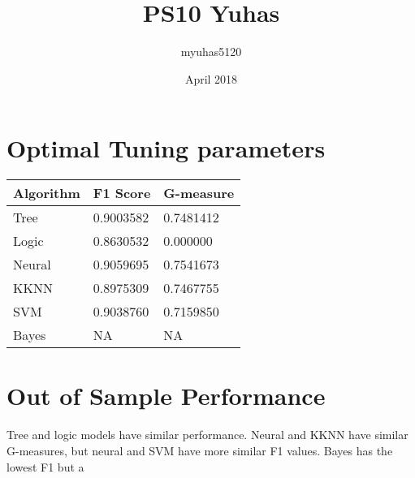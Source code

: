 \documentclass{article}
\title{PS10 Yuhas}
\author{myuhas5120 }
\date{April 2018}
\begin{document}
\maketitle

\section{Optimal Tuning parameters}
\begin{tabular}{ |p{3cm}||p{3cm}|p{3cm}| }
 \hline
 Algorithm & F1 Score & G-measure \\
 \hline
 Tree   & 0.9003582    & 0.7481412\\
 Logic &  0.8630532 & 0.000000 \\
 Neural & 0.9059695 & 0.7541673\\
 KKNN    & 0.8975309 & 0.7467755\\
 SVM &   0.9038760  & 0.7159850\\
 Bayes& NA  & NA   \\
 \hline
\end{tabular}

\section{Out of Sample Performance}
Tree and logic models have similar performance.  Neural and KKNN have similar G-measures, but neural and SVM have more similar F1 values.  Bayes has the lowest F1 but a 
\end{document}
